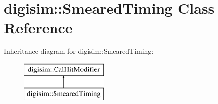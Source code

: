 \section{digisim\-:\-:Smeared\-Timing Class Reference}
\label{classdigisim_1_1SmearedTiming}
Inheritance diagram for digisim\-:\-:Smeared\-Timing\-:\begin{figure}[H]
\begin{center}
\leavevmode
\includegraphics[height=2.000000cm]{classdigisim_1_1SmearedTiming}
\end{center}
\end{figure}
